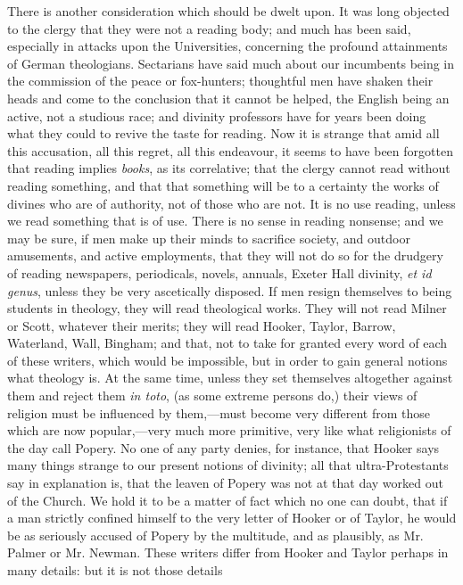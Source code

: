 There is another consideration which should be
dwelt upon. It was long objected to the clergy that they were not a
reading body; and much has been said, especially in attacks upon the
Universities, concerning the profound attainments of German
theologians. Sectarians have said much about our incumbents being in
the commission of the peace or fox-hunters; thoughtful men have shaken
their heads and come to the conclusion that it cannot be helped, the
English being an active, not a studious race; and divinity professors
have for years been doing what they could to revive the taste for
reading. Now it is strange that amid all this accusation, all this
regret, all this endeavour, it seems to have been forgotten that
reading implies \emph{books}, as its correlative; that the clergy
cannot read without reading something, and that that something will be
to a certainty the works of divines who are of authority, not of those
who are not. It is no use reading, unless we read something that is of
use. There is no sense in reading nonsense; and we may be sure, if men
make up their minds to sacrifice society, and outdoor amusements, and
active employments, that they will not do so for the drudgery of
reading newspapers, periodicals, novels, annuals, Exeter Hall
divinity, \emph{et id genus}, unless they be very ascetically
disposed. If men resign themselves to being students in theology, they
will read theological works. They will not read Milner or Scott,
whatever their merits; they will read Hooker, Taylor, Barrow,
Waterland, Wall, Bingham; and that, not to take for granted every word
of each of these writers, which would be impossible, but in order to
gain general notions what theology is. At the same time, unless they
set themselves altogether against them and reject them \emph{in toto},
(as some extreme persons do,) their views of religion must be
influenced by them,—must become very different from those which are
now popular,—very much more primitive, very like what religionists
of the day call Popery. No one of any party denies, for instance, that
Hooker says many things strange to our present notions of divinity;
all that ultra-Protestants say in explanation is, that the leaven of
Popery was not at that day worked out of the Church. We hold it to be
a matter of fact which no one can doubt, that if a man strictly
confined himself to the very letter of Hooker or of Taylor, he would
be as seriously accused of Popery by the multitude, and as plausibly,
as Mr. Palmer or Mr. Newman. These writers differ from Hooker and
Taylor perhaps in many details: but it is not those details
